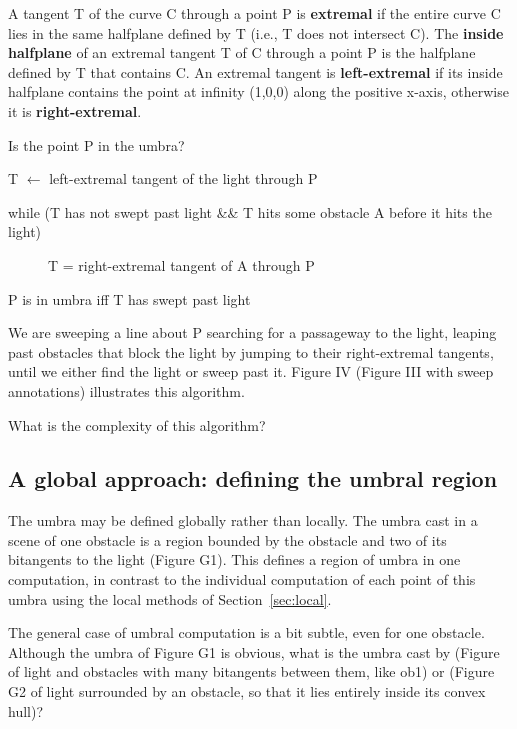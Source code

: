 \documentclass[12pt]{article}
\begin{document}
\begin{defn2}
A tangent T of the curve C through a point P is {\bf extremal}
if the entire curve C lies in the same halfplane defined by T
(i.e., T does not intersect C).
The {\bf inside halfplane} of an extremal tangent T of C through a point P is
the halfplane defined by T that contains C.
An extremal tangent is {\bf left-extremal} if its inside halfplane 
contains the point at infinity (1,0,0) along the positive x-axis,
otherwise it is {\bf right-extremal}.
\end{defn2}

Is the point P in the umbra?
\begin{description}
\item[] T $\leftarrow$ left-extremal tangent of the light through P
\item[] while (T has not swept past light \&\& 
       T hits some obstacle A before it hits the light)
\begin{description}
\item[]	T = right-extremal tangent of A through P
\end{description}
\item P is in umbra iff T has swept past light
\end{description}

We are sweeping a line about P searching for a passageway to the light, 
leaping past obstacles that block the light by jumping to their right-extremal tangents, 
until we either find the light or sweep past it.
Figure IV (Figure III with sweep annotations) illustrates this algorithm.

What is the complexity of this algorithm?


\clearpage

\subsection{A global approach: defining the umbral region}

The umbra may be defined globally rather than locally.
The umbra cast in a scene of one obstacle is a region bounded by the obstacle
and two of its bitangents to the light (Figure G1).
This defines a region of umbra in one computation, in contrast to the individual
computation of each point of this umbra using the local methods of 
Section~\ref{sec:local}.

The general case of umbral computation is a bit subtle, even for one obstacle.
Although the umbra of Figure G1 is obvious,
what is the umbra cast by (Figure of light and obstacles with
many bitangents between them, like ob1) or (Figure G2 of light surrounded by an obstacle,
so that it lies entirely inside its convex hull)?
\end{document}
